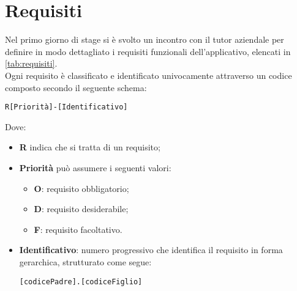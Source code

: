 \section{Requisiti}
Nel primo giorno di stage si è svolto un incontro con il tutor aziendale per definire in modo dettagliato i requisiti funzionali dell'applicativo, elencati in \autoref{tab:requisiti}.\\
Ogni requisito è classificato e identificato univocamente attraverso un codice composto secondo il seguente schema:
\begin{center}
	\texttt{R[Priorità]-[Identificativo]}
\end{center}
Dove:
\begin{itemize}
	\item \textbf{R} indica che si tratta di un requisito;
	\item \textbf{Priorità} può assumere i seguenti valori:
	\begin{itemize}
		\item \textbf{O}: requisito obbligatorio;
		\item \textbf{D}: requisito desiderabile;
		\item \textbf{F}: requisito facoltativo.
	\end{itemize}
	\item \textbf{Identificativo}: numero progressivo che identifica il requisito in forma gerarchica, strutturato
	come segue:
	\begin{center}
		\texttt{[codicePadre].[codiceFiglio]}
	\end{center}
\end{itemize} 

